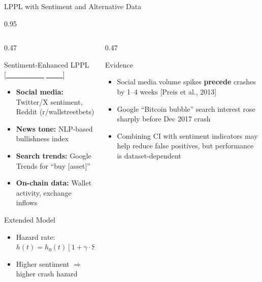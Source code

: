 \documentclass[9pt, aspectratio=169, t]{beamer}
\begin{document}
\begin{frame}{LPPL with Sentiment and Alternative Data}
    \begin{cminipage}{0.95\textwidth}
    {\scriptsize
    \begin{columns}[T]
        \begin{column}{0.47\textwidth}
            \begin{block}{Sentiment-Enhanced LPPL {\scriptsize[\href{https://doi.org/10.1016/j.jebo.2013.06.005}{\textcolor{white}{Hüsler et al., 2013}}]}}
                \begin{itemize}\setlength{\itemsep}{0pt}
                    \item \textbf{Social media:} Twitter/X sentiment, Reddit (r/wallstreetbets)
                    \item \textbf{News tone:} NLP-based bullishness index
                    \item \textbf{Search trends:} Google Trends for ``buy [asset]''
                    \item \textbf{On-chain data:} Wallet activity, exchange inflows
                \end{itemize}
            \end{block}
            \vspace{-2mm}
            \begin{exampleblock}{Extended Model}
                \begin{itemize}\setlength{\itemsep}{0pt}
                    \item Hazard rate: $h(t) = h_0(t)[1 + \gamma \cdot \text{Sent}(t)]$
                    \item Higher sentiment $\Rightarrow$ higher crash hazard
                \end{itemize}
            \end{exampleblock}
        \end{column}
        \begin{column}{0.47\textwidth}
            \begin{exampleblock}{Evidence}
                \begin{itemize}\setlength{\itemsep}{0pt}
                    \item Social media volume spikes \textbf{precede} crashes by 1--4 weeks [Preis et al., 2013]
                    \item Google ``Bitcoin bubble'' search interest rose sharply before Dec 2017 crash
                    \item Combining CI with sentiment indicators may help reduce false positives, but performance is dataset-dependent

\end{itemize}
\end{exampleblock}
\end{column}
\end{columns}}
\end{cminipage}
\end{frame}
\end{document}
